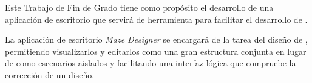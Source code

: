 Este Trabajo de Fin de Grado tiene como propósito el desarrollo de una aplicación de escritorio que servirá de herramienta para facilitar el desarrollo de .

La aplicación de escritorio \textit{Maze Designer} se encargará de la tarea del diseño de , permitiendo visualizarlos y editarlos como una gran estructura conjunta en lugar de como escenarios aislados y facilitando una interfaz lógica que compruebe la corrección de un diseño.